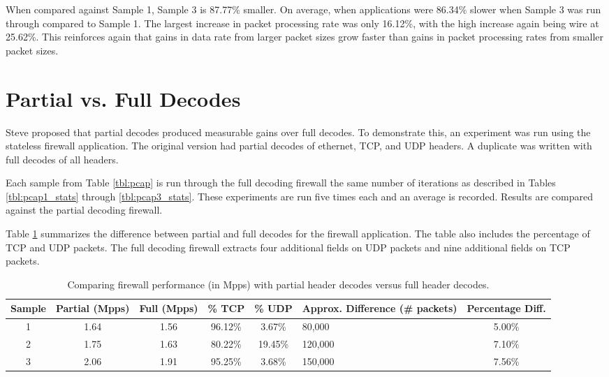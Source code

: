 When compared against Sample 1, Sample 3 is 87.77\% smaller. On average, when applications were 86.34\% slower when Sample 3 was run through compared to Sample 1.
The largest increase in packet processing rate was only 16.12\%, with the high increase again being wire at 25.62\%. This reinforces again that gains in data rate from larger packet sizes grow faster than gains in packet processing rates from smaller packet sizes.


\section{Partial vs. Full Decodes} \label{exp:decode_comparison}

Steve proposed that partial decodes produced measurable gains over full decodes. To demonstrate this, an experiment was run using the stateless firewall application. The original version had partial decodes of ethernet, TCP, and UDP headers. A duplicate was written with full decodes of all headers.

Each sample from Table \ref{tbl:pcap} is run through the full decoding firewall the same number of iterations as described in Tables \ref{tbl:pcap1_stats} through \ref{tbl:pcap3_stats}. These experiments are run five times each and an average is recorded. Results are compared against the partial decoding firewall.

Table \ref{tbl:firewall_cmp} summarizes the difference between partial and full decodes for the firewall application. The table also includes the percentage of TCP and UDP packets. The full decoding firewall extracts four additional fields on UDP packets and nine additional fields on TCP packets. 

\begin{table}[ht]
\caption{Comparing firewall performance (in Mpps) with partial header decodes versus full header decodes.}
\begin{center}
\begin{tabularx}{\linewidth}{| c || c | c | c | c | X | c |}
\hline
Sample & Partial (Mpps) & Full (Mpps) & \% TCP & \% UDP & Approx. Difference (\# packets) & Percentage Diff. \\
\hline
1 & 1.64 & 1.56 & 96.12\% & 3.67\% & 80,000 & 5.00\% \\
\hline
2 & 1.75 & 1.63 & 80.22\% & 19.45\% & 120,000 & 7.10\% \\
\hline
3 & 2.06 & 1.91 & 95.25\% & 3.68\% & 150,000 & 7.56\% \\ 
\hline
\end{tabularx}
\end{center}
\label{tbl:firewall_cmp}
\end{table}


